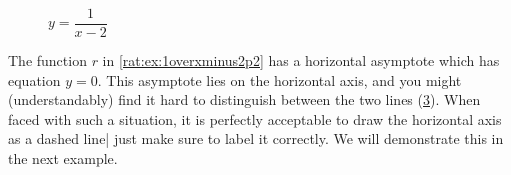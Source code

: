 \begin{figure}[!htbp]
    \begin{subfigure}{.45\textwidth}
        \caption{}
        \label{rat:fig:1overxminus2p1}
    \end{subfigure}%
    \hfill
    \begin{subfigure}{.45\textwidth}
        \caption{}
        \label{rat:fig:1overxminus2p2}
    \end{subfigure}%
    \caption{$y=\dfrac{1}{x-2}$}
\end{figure}

The function $r$ in \cref{rat:ex:1overxminus2p2} has a horizontal asymptote which has equation $y=0$.
This asymptote lies on the horizontal axis, and you might (understandably) find it hard 
to distinguish between the two lines (\cref{rat:fig:1overxminus2p2}). When faced
with such a situation, it is perfectly acceptable to draw the horizontal axis 
as a dashed line| just make sure to label it correctly. We will demonstrate this 
in the next example.

